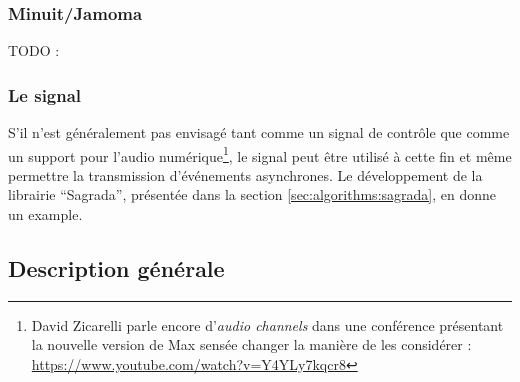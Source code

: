 \subsubsection{Minuit/Jamoma}

TODO : \cite{de_la_hogue_jamoma_2011}

\subsubsection{Le signal}

\noindent S'il n'est généralement pas envisagé tant comme un signal de contrôle que comme un support pour l'audio numérique\footnote{David Zicarelli parle encore d'\textit{audio channels} dans une conférence présentant la nouvelle version de Max sensée changer la manière de les considérer : \url{https://www.youtube.com/watch?v=Y4YLy7kqcr8}}, le signal peut être utilisé à cette fin et même permettre la transmission d'événements asynchrones. Le développement de la librairie ``Sagrada'', présentée dans la section \ref{sec:algorithms:sagrada}, en donne un example.\\

\subsection{Description générale}

